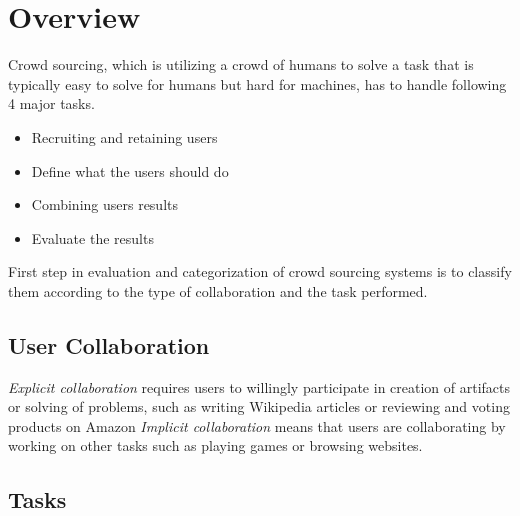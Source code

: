 \documentclass{sig-alternate}
\begin{document}



\section{Overview}
Crowd sourcing, which is utilizing a crowd of humans to solve a task that is typically easy to solve for humans but hard for machines, has to handle following 4 major tasks.
\begin{itemize}
\item Recruiting and retaining users
\item Define what the users should do
\item Combining users results
\item Evaluate the results
\end{itemize}
First step in evaluation and categorization of crowd sourcing systems is to classify them according to the type of collaboration and the task performed.
\newline\newline
\subsection{User Collaboration}
\textit{Explicit collaboration} requires users to willingly participate in creation of artifacts or solving of problems, such as writing Wikipedia articles or reviewing and voting products on Amazon
\newline\newline
\textit{Implicit collaboration} means that users are collaborating by working on other tasks such as playing games or browsing websites.
\subsection{Tasks}
\end{document}
